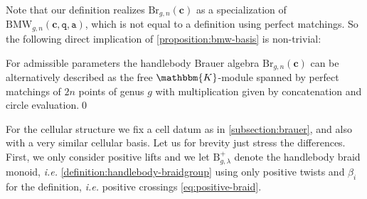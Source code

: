\documentclass[a4paper,11pt]{amsart}
\newcommand{\ie}{\textsl{i.e.}}
\newcommand{\setstuff}[1]{\mathrm{#1}}
\newcommand{\KK}{\mathbbm{K}}
\newcommand{\bsym}[1]{\boldsymbol{#1}}
\newcommand{\varsym}[1]{\mathtt{#1}}
\newcommand{\qvar}{\varsym{q}}
\newcommand{\cpar}{\bsym{c}}
\newcommand{\avar}{\varsym{a}}
\numberwithin{equation}{section}
\let\fullref\autoref
\begin{document}
Note that our definition realizes $\setstuff{Br}_{g,n}(\cpar)$ 
as a specialization of $\setstuff{BMW}_{g,n}(\cpar,\qvar,\avar)$, which 
is not equal to a definition using perfect matchings. So the following
direct implication of \fullref{proposition:bmw-basis} is non-trivial:

\begin{proposition}\label{proposition:brauer-good}
For admissible parameters the handlebody 
Brauer algebra $\setstuff{Br}_{g,n}(\cpar)$ can be alternatively 
described as the free $\KK$-module spanned by 
perfect matchings of $2n$ points of genus $g$ with multiplication 
given by concatenation and circle evaluation.\qed
\end{proposition}

For the cellular structure we fix a cell datum as in 
\fullref{subsection:brauer}, and also with a very similar 
cellular basis. Let us for brevity just stress the differences.
First, we only consider positive lifts and we let 
$\setstuff{B}_{g,\lambda}^{+}$ denote the handlebody braid monoid, {\ie}
\fullref{definition:handlebody-braidgroup} 
using only positive twists and $\beta_{i}$ 
for the definition, {\ie} positive crossings \eqref{eq:positive-braid}.
\end{document}
